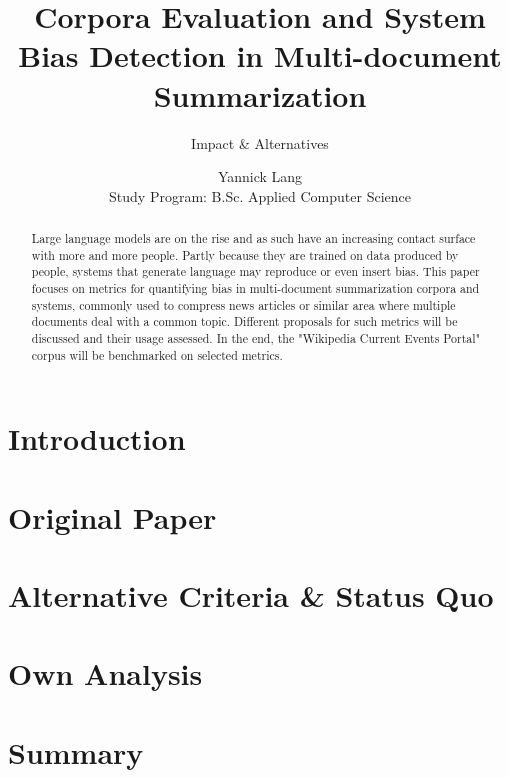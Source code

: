 \documentclass[runningheads]{llncs}
\begin{document}
\title{Corpora Evaluation and System Bias Detection in Multi-document Summarization}
\subtitle{Impact \& Alternatives}
\author{Yannick Lang \\
    \small Study Program: B.Sc. Applied Computer Science }

\maketitle              %


\begin{abstract}
    Large language models are on the rise and as such have an increasing contact surface with more and more people. Partly because they are trained on data produced by people, systems that generate language may reproduce or even insert bias. This paper focuses on metrics for quantifying bias in multi-document summarization corpora and systems, commonly used to compress news articles or similar area where multiple documents deal with a common topic. Different proposals for such metrics will be discussed and their usage assessed. In the end, the "Wikipedia Current Events Portal" corpus will be benchmarked on selected metrics.
    
\end{abstract}

\section{Introduction}
\label{sec:introcution}


\section{Original Paper}
\label{sec:original-paper}


\section{Alternative Criteria \& Status Quo}
\label{sec:alternative-criteria}


\section{Own Analysis}
\label{sec:analysis}


\section{Summary}
\label{sec:summary}





\end{document}
